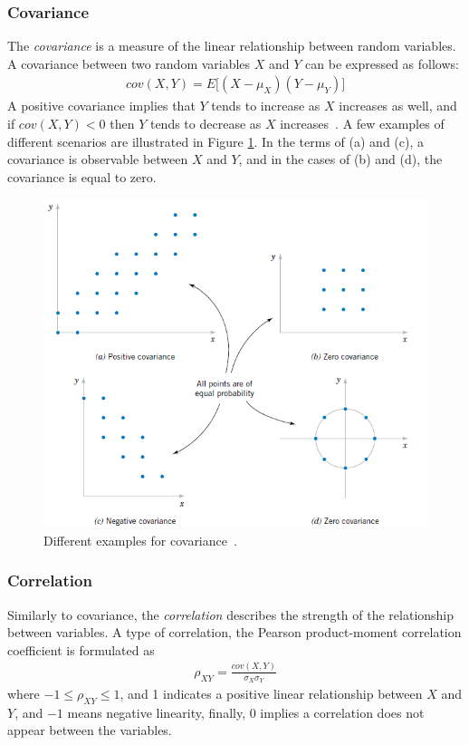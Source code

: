 \subsubsection{Covariance}
The \textit{covariance} is a measure of the linear relationship between random variables. A covariance between two random variables $X$ and $Y$ can be expressed as follows:
\begin{align}
	cov(X,Y) = E\big[(X - \mu_X)(Y - \mu_Y)\big]
\end{align}
A positive covariance implies that $Y$ tends to increase as $X$ increases as well, and if $cov(X,Y) < 0$ then $Y$ tends to decrease as $X$ increases~\cite{covariance}. A few examples of different scenarios are illustrated in Figure \ref{fig:covariance}. In the terms of (a) and (c), a covariance is observable between $X$ and $Y$, and in the cases of (b) and (d), the covariance is equal to zero.

\begin{figure}[!ht]
	\centering
	\includegraphics[width=140mm, keepaspectratio]{figures/covariance.png}
	\caption{Different examples for covariance~\cite{statistics_book}.}
	\label{fig:covariance}
\end{figure}

\subsubsection{Correlation}
Similarly to covariance, the \textit{correlation} describes the strength of the relationship between variables. A type of correlation, the Pearson product-moment correlation coefficient is formulated as
\begin{align}
	\rho_{XY} = \frac{cov(X, Y)}{\sigma_X\sigma_Y}
\end{align}
where $ -1 \leq \rho_{XY} \leq 1$, and 1 indicates a positive linear relationship between $X$ and $Y$, and $-1$ means negative linearity, finally, 0 implies a correlation does not appear between the variables.

